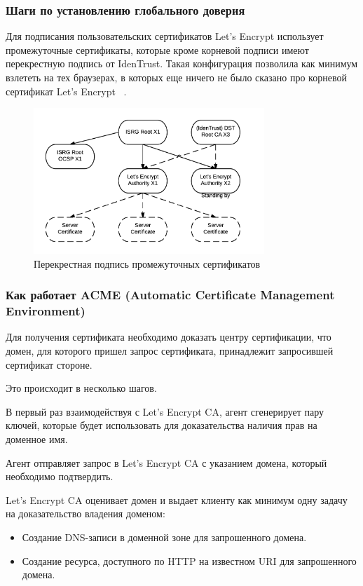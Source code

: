 \documentclass[10pt, a5paper]{article}
\begin{document}
\subsubsection*{Шаги по установлению глобального доверия}

Для подписания пользовательских сертификатов Let’s Encrypt использует промежуточные сертификаты, которые кроме корневой подписи имеют перекрестную подпись от IdenTrust. Такая конфигурация позволила как минимум взлететь на тех браузерах, в которых еще ничего не было сказано про корневой сертификат Let’s Encrypt ~\cite{Kharkevich4}.

\begin{figure}[h!]
  \centering
  \includegraphics[height=5.5cm]{w_03_2016_Kharkevich6.png}
\caption*{Перекрестная подпись промежуточных сертификатов}\label{fig:Kharkevich6}
\end{figure}


\subsubsection*{Как работает ACME (Automatic Certificate Management Environment)}

Для получения  сертификата необходимо доказать центру сертификации, что домен, для которого пришел запрос сертификата, принадлежит запросившей сертификат стороне.

Это происходит в несколько шагов.

В первый раз взаимодействуя с Let's Encrypt CA, агент сгенерирует пару ключей, которые будет использовать для доказательства наличия прав на доменное имя.

Агент отправляет запрос в Let's Encrypt CA с указанием домена, который необходимо подтвердить.

Let’s Encrypt CA оценивает домен и выдает клиенту как минимум одну задачу на доказательство владения доменом:

\begin{itemize}
  \item Создание DNS-записи в доменной зоне для запрошенного домена.
  \item Создание ресурса, доступного по HTTP на известном URI для запрошенного домена.
\end{itemize}
\end{document}
